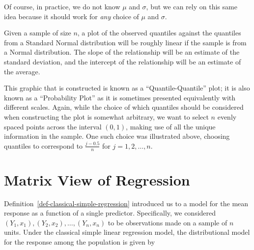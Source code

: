 \documentclass[
  letterpaper,
  DIV=11,
  numbers=noendperiod]{scrreprt}
\theoremstyle{definition}
\theoremstyle{plain}
\theoremstyle{definition}
\theoremstyle{remark}
\begin{document}
Of course, in practice, we do not know \(\mu\) and \(\sigma\), but we
can rely on this same idea because it should work for \emph{any} choice
of \(\mu\) and \(\sigma\).

\begin{tcolorbox}[enhanced jigsaw, rightrule=.15mm, leftrule=.75mm, opacityback=0, coltitle=black, bottomrule=.15mm, opacitybacktitle=0.6, left=2mm, colframe=quarto-callout-note-color-frame, breakable, colback=white, arc=.35mm, toprule=.15mm, toptitle=1mm, bottomtitle=1mm, title=\textcolor{quarto-callout-note-color}{\faInfo}\hspace{0.5em}{Assessing Normality}, titlerule=0mm, colbacktitle=quarto-callout-note-color!10!white]

Given a sample of size \(n\), a plot of the observed quantiles against
the quantiles from a Standard Normal distribution will be roughly linear
if the sample is from a Normal distribution. The slope of the
relationship will be an estimate of the standard deviation, and the
intercept of the relationship will be an estimate of the average.

\end{tcolorbox}

This graphic that is constructed is known as a ``Quantile-Quantile''
plot; it is also known as a ``Probability Plot'' as it is sometimes
presented equivalently with different scales. Again, while the choice of
which quantiles should be considered when constructing the plot is
somewhat arbitrary, we want to select \(n\) evenly spaced points across
the interval \((0, 1)\), making use of all the unique information in the
sample. One such choice was illustrated above, choosing quantiles to
correspond to \(\frac{j - 0.5}{n}\) for \(j = 1,2,\dotsc,n\).


\chapter{Matrix View of Regression}\label{sec-matrix}

\providecommand{\norm}[1]{\left\lVert#1\right\rVert}
\providecommand{\abs}[1]{\left\lvert#1\right\rvert}
\providecommand{\dist}[1]{\stackrel{\text{#1}}{\sim}}
\providecommand{\ind}[1]{\mathbb{I}\left(#1\right)}
\providecommand{\bm}[1]{\mathbf{#1}}
\providecommand{\bs}[1]{\boldsymbol{#1}}
\providecommand{\Ell}{\mathcal{L}}
\providecommand{\indep}{\perp\negthickspace\negmedspace\perp}

Definition~\ref{def-classical-simple-regression} introduced us to a
model for the mean response as a function of a single predictor.
Specifically, we considered
\(\left(Y_1, x_1\right), \left(Y_2, x_2\right), \dotsc, \left(Y_n, x_n\right)\)
to be observations made on a sample of \(n\) units. Under the classical
simple linear regression model, the distributional model for the
response among the population is given by
\end{document}
